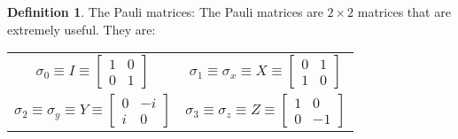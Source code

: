 \documentclass[letterpaper]{article}
\theoremstyle{definition}
\newtheorem{definition}{Definition}[section]
\begin{document}
\begin{definition}{The Pauli matrices: }
The Pauli matrices are $2 \times 2$ matrices that are extremely useful. They are: 
\begin{center}
\begin{tabular}{ p{5cm} p{5cm} }
$$\sigma_{0} \equiv I \equiv \begin{bmatrix}
1 & 0 \\
0 & 1
\end{bmatrix}$$ & $$\sigma_{1} \equiv \sigma_{x} \equiv X \equiv \begin{bmatrix}
0 & 1 \\
1 & 0
\end{bmatrix}$$ \\
$$\sigma_{2} \equiv \sigma_{y} \equiv Y \equiv \begin{bmatrix}
0 & -i \\
i & 0
\end{bmatrix}$$ & $$\sigma_{3} \equiv \sigma_{z} \equiv Z \equiv \begin{bmatrix}
1 & 0 \\
0 & -1
\end{bmatrix}$$
\end{tabular}
\end{center}
\end{definition}
\end{document}
